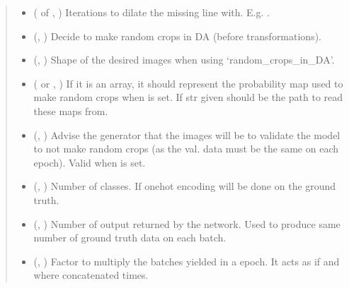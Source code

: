 \documentclass[letterpaper,10pt,english]{sphinxmanual}
\begin{document}
\begin{fulllineitems}
\begin{quote}
\begin{description}
\begin{itemize}
\item {} 
 ( of , ) \textendash{} Iterations to dilate the missing line with. E.g. .

\item {} 
 (, ) \textendash{} Decide to make random crops in DA (before transformations).

\item {} 
 (, ) \textendash{} Shape of the desired images when using ‘random\_crops\_in\_DA’.

\item {} 
 ( or , ) \textendash{} If it is an array, it should represent the probability map used to make random crops when
 is set. If str given should be the path to read these maps from.

\item {} 
 (, ) \textendash{} Advise the generator that the images will be to validate the model to not make random crops (as the val.
data must be the same on each epoch). Valid when  is set.

\item {} 
 (, ) \textendash{} Number of classes. If  one\sphinxhyphen{}hot encoding will be done on the ground truth.

\item {} 
 (, ) \textendash{} Number of output returned by the network. Used to produce same number of ground truth data on each batch.

\item {} 
 (, ) \textendash{} Factor to multiply the batches yielded in a epoch. It acts as if  and  where concatenated
 times.


\end{itemize}
\end{description}
\end{quote}
\end{fulllineitems}
\end{document}
